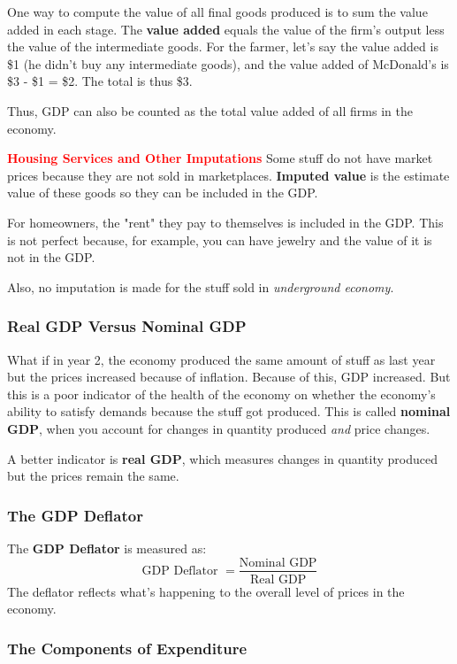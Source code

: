 \documentclass[12pt]{article}
\newcommand{\leadwords}[2]{\textcolor{red}{\textbf{\large #1}} #2}
\begin{document}
One way to compute the value of all final goods produced is to sum the value added in each stage. The \textbf{value added} equals the value of the firm's output less the value of the intermediate goods. For the farmer, let's say the value added is \$1 (he didn't buy any intermediate goods), and the value added of McDonald's is \$3 - \$1 = \$2. The total is thus \$3.

Thus, GDP can also be counted as the total value added of all firms in the economy.

\leadwords{Housing Services and Other Imputations} Some stuff do not have market prices because they are not sold in marketplaces. \textbf{Imputed value} is the estimate value of these goods so they can be included in the GDP.

For homeowners, the "rent" they pay to themselves is included in the GDP. This is not perfect because, for example, you can have jewelry and the value of it is not in the GDP.

Also, no imputation is made for the stuff sold in \textit{underground economy}.

\subsubsection{Real GDP Versus Nominal GDP}

What if in year 2, the economy produced the same amount of stuff as last year but the prices increased because of inflation. Because of this, GDP increased. But this is a poor indicator of the health of the economy on whether the economy's ability to satisfy demands because the stuff got produced. This is called \textbf{nominal GDP}, when you account for changes in quantity produced \textit{and} price changes.

A better indicator is \textbf{real GDP}, which measures changes in quantity produced but the prices remain the same.


\subsubsection{The GDP Deflator}

The \textbf{GDP Deflator} is measured as: $$\text{GDP Deflator } = \frac{\text{Nominal GDP}}{\text{Real GDP}}$$
The deflator reflects what's happening to the overall level of prices in the economy.



\subsubsection{The Components of Expenditure}
\end{document}
